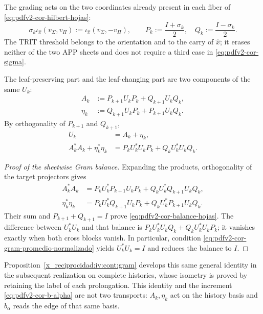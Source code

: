 The grading acts on the two coordinates already present in each fiber of \eqref{eq:pdfv2-cor-hilbert-hojas}:
\begin{equation}
\label{eq:pdfv2-cor-sigma}
 \sigma_k\iota_{\widehat x}(v_\Sigma,v_\Pi)
 :=\iota_{\widehat x}(v_\Sigma,-v_\Pi),
\qquad
 P_k:=\frac{I+\sigma_k}{2},\quad
 Q_k:=\frac{I-\sigma_k}{2}.
\end{equation}
The TRIT threshold belongs to the orientation and to the carry of
\(\widehat x\); it erases neither of the two APP sheets and does not require a third
case in \eqref{eq:pdfv2-cor-sigma}.

The leaf-preserving part and the leaf-changing part are two components of
the same \(U_k\):
\begin{align}
 A_k&:=P_{k+1}U_kP_k+Q_{k+1}U_kQ_k,
 \label{eq:pdfv2-cor-a-comun}\\
 \eta_k&:=Q_{k+1}U_kP_k+P_{k+1}U_kQ_k.
 \label{eq:pdfv2-cor-eta-comun}
\end{align}
By orthogonality of \(P_{k+1}\) and \(Q_{k+1}\),
\begin{equation}
\label{eq:pdfv2-cor-balance-hojas}
 \begin{aligned}
 U_k&=A_k+\eta_k,\\
 A_k^*A_k+\eta_k^*\eta_k
 &=P_kU_k^*U_kP_k+Q_kU_k^*U_kQ_k.
 \end{aligned}
\end{equation}
\begin{proof}[Proof of the sheetwise Gram balance]
Expanding the products, orthogonality of the target projectors gives
\[
\begin{aligned}
 A_k^*A_k
 &=P_kU_k^*P_{k+1}U_kP_k+Q_kU_k^*Q_{k+1}U_kQ_k,\\
 \eta_k^*\eta_k
 &=P_kU_k^*Q_{k+1}U_kP_k+Q_kU_k^*P_{k+1}U_kQ_k.
\end{aligned}
\]
Their sum and \(P_{k+1}+Q_{k+1}=I\) prove \eqref{eq:pdfv2-cor-balance-hojas}. The difference between \(U_k^*U_k\) and that balance is \(P_kU_k^*U_kQ_k+Q_kU_k^*U_kP_k\); it vanishes exactly when both cross blocks vanish. In particular, condition \eqref{eq:pdfv2-cor-gram-promedio-normalizado} yields \(U_k^*U_k=I\) and reduces the balance to \(I\).
\end{proof}
Proposition~\ref{x_reciprocidad:iv:cont:gram} develops this same general identity in the subsequent realization on complete histories, whose isometry is proved by retaining the label of each prolongation. This identity and the increment \eqref{eq:pdfv2-cor-b-alpha} are not two transports: \(A_k,\eta_k\) act on the history basis and \(b_\alpha\) reads the edge of that same basis.

